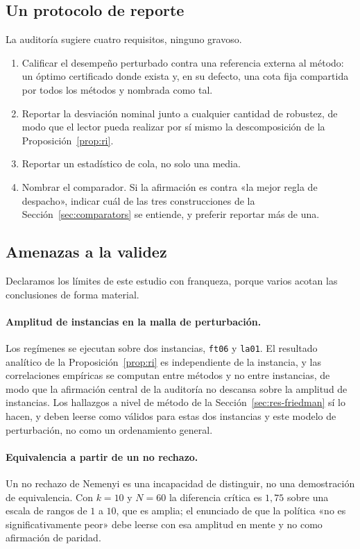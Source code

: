 \documentclass[a4paper,fleqn]{cas-sc}
\begin{document}
\subsection{Un protocolo de reporte}

La auditoría sugiere cuatro requisitos, ninguno gravoso.
\begin{enumerate}[(1)]
\item Calificar el desempeño perturbado contra una referencia externa al método:
un óptimo certificado donde exista y, en su defecto, una cota fija compartida
por todos los métodos y nombrada como tal.
\item Reportar la desviación nominal junto a cualquier cantidad de robustez, de
modo que el lector pueda realizar por sí mismo la descomposición de la
Proposición~\ref{prop:ri}.
\item Reportar un estadístico de cola, no solo una media.
\item Nombrar el comparador. Si la afirmación es contra «la mejor regla de
despacho», indicar cuál de las tres construcciones de la
Sección~\ref{sec:comparators} se entiende, y preferir reportar más de una.
\end{enumerate}

\subsection{Amenazas a la validez}\label{sec:threats}

Declaramos los límites de este estudio con franqueza, porque varios acotan las
conclusiones de forma material.

\paragraph{Amplitud de instancias en la malla de perturbación.} Los \NRegimes{}
regímenes se ejecutan sobre dos instancias, \texttt{ft06} y \texttt{la01}. El
resultado analítico de la Proposición~\ref{prop:ri} es independiente de la
instancia, y las correlaciones empíricas se computan entre métodos y no entre
instancias, de modo que la afirmación central de la auditoría no descansa sobre
la amplitud de instancias. Los hallazgos a nivel de método de la
Sección~\ref{sec:res-friedman} sí lo hacen, y deben leerse como válidos para
estas dos instancias y este modelo de perturbación, no como un ordenamiento
general.

\paragraph{Equivalencia a partir de un no rechazo.} Un no rechazo de Nemenyi es
una incapacidad de distinguir, no una demostración de equivalencia. Con $k=10$ y
$N=60$ la diferencia crítica es $1{,}75$ sobre una escala de rangos de $1$ a
$10$, que es amplia; el enunciado de que la política «no es significativamente
peor» debe leerse con esa amplitud en mente y no como afirmación de paridad.
\end{document}
